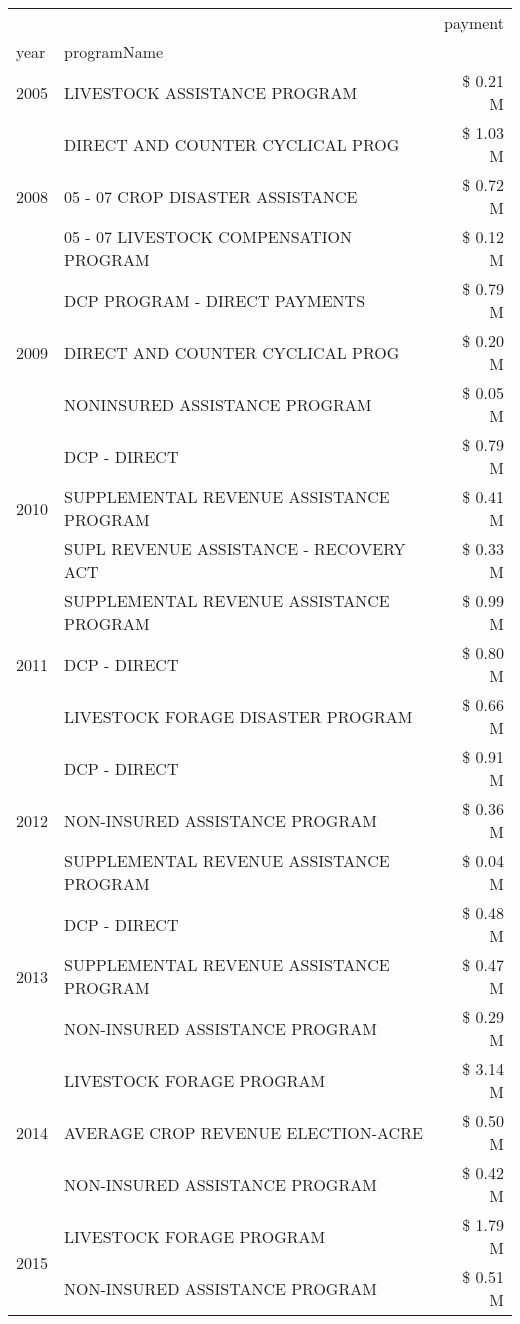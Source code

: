 \begin{tabular}{llr}
\toprule
 &  & payment \\
year & programName &  \\
\midrule
2005 & LIVESTOCK ASSISTANCE PROGRAM & \$ 0.21 M \\
\cline{1-3}
\multirow[t]{3}{*}{2008} & DIRECT AND COUNTER CYCLICAL PROG & \$ 1.03 M \\
 & 05 - 07 CROP DISASTER ASSISTANCE & \$ 0.72 M \\
 & 05 - 07 LIVESTOCK COMPENSATION PROGRAM & \$ 0.12 M \\
\cline{1-3}
\multirow[t]{3}{*}{2009} & DCP PROGRAM - DIRECT PAYMENTS & \$ 0.79 M \\
 & DIRECT AND COUNTER CYCLICAL PROG & \$ 0.20 M \\
 & NONINSURED ASSISTANCE PROGRAM & \$ 0.05 M \\
\cline{1-3}
\multirow[t]{3}{*}{2010} & DCP - DIRECT & \$ 0.79 M \\
 & SUPPLEMENTAL REVENUE ASSISTANCE PROGRAM & \$ 0.41 M \\
 & SUPL REVENUE ASSISTANCE - RECOVERY ACT & \$ 0.33 M \\
\cline{1-3}
\multirow[t]{3}{*}{2011} & SUPPLEMENTAL REVENUE ASSISTANCE PROGRAM & \$ 0.99 M \\
 & DCP - DIRECT & \$ 0.80 M \\
 & LIVESTOCK FORAGE DISASTER PROGRAM & \$ 0.66 M \\
\cline{1-3}
\multirow[t]{3}{*}{2012} & DCP - DIRECT & \$ 0.91 M \\
 & NON-INSURED ASSISTANCE PROGRAM & \$ 0.36 M \\
 & SUPPLEMENTAL REVENUE ASSISTANCE PROGRAM & \$ 0.04 M \\
\cline{1-3}
\multirow[t]{3}{*}{2013} & DCP - DIRECT & \$ 0.48 M \\
 & SUPPLEMENTAL REVENUE ASSISTANCE PROGRAM & \$ 0.47 M \\
 & NON-INSURED ASSISTANCE PROGRAM & \$ 0.29 M \\
\cline{1-3}
\multirow[t]{3}{*}{2014} & LIVESTOCK FORAGE PROGRAM & \$ 3.14 M \\
 & AVERAGE CROP REVENUE ELECTION-ACRE & \$ 0.50 M \\
 & NON-INSURED ASSISTANCE PROGRAM & \$ 0.42 M \\
\cline{1-3}
\multirow[t]{3}{*}{2015} & LIVESTOCK FORAGE PROGRAM & \$ 1.79 M \\
 & NON-INSURED ASSISTANCE PROGRAM & \$ 0.51 M \\

\end{tabular}
